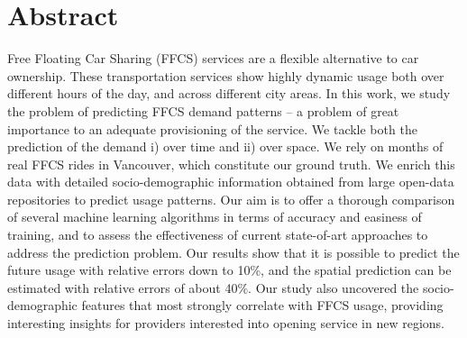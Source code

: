 \section{Abstract}
Free Floating Car Sharing (FFCS) services are a flexible alternative to car ownership. These transportation services show highly dynamic usage both over different hours of the day, and across different city areas. 
In this work, we study the problem of predicting FFCS demand patterns -- a problem of great importance to an adequate provisioning of the service. We tackle both the prediction of the demand i) over time and ii) over space. 
We rely on months of real FFCS rides in Vancouver, which constitute our ground truth. We enrich this data with detailed socio-demographic information obtained from large open-data repositories to predict usage patterns. 
Our aim is to offer a thorough comparison of several machine learning algorithms in terms of accuracy and easiness of training, and to assess the effectiveness of current state-of-art approaches to address the prediction problem.
Our results show that it is possible to predict the future usage with relative errors down to 10\%, and the spatial prediction can be estimated with relative errors of about 40\%.
Our study also uncovered the socio-demographic features that most strongly correlate with FFCS usage, providing interesting insights for providers interested into opening service in new regions.


